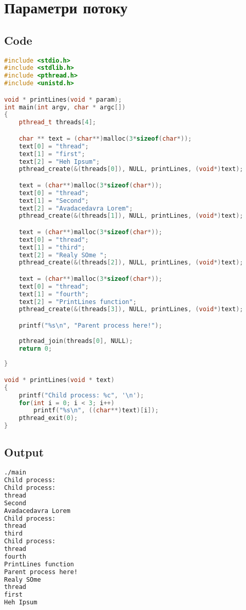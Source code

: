 \documentclass{article}
\begin{document}
\newpage
\section{Параметри потоку}
\subsection{Code}\vspace{-3mm}
\begin{lstlisting}[language=C++]
#include <stdio.h>
#include <stdlib.h>
#include <pthread.h>
#include <unistd.h>

void * printLines(void * param);
int main(int argv, char * argc[])
{
    pthread_t threads[4];

    char ** text = (char**)malloc(3*sizeof(char*));
    text[0] = "thread"; 
    text[1] = "first"; 
    text[2] = "Heh Ipsum";
    pthread_create(&(threads[0]), NULL, printLines, (void*)text);

    text = (char**)malloc(3*sizeof(char*));
    text[0] = "thread"; 
    text[1] = "Second"; 
    text[2] = "Avadacedavra Lorem";
    pthread_create(&(threads[1]), NULL, printLines, (void*)text);

    text = (char**)malloc(3*sizeof(char*));
    text[0] = "thread"; 
    text[1] = "third"; 
    text[2] = "Realy SOme ";
    pthread_create(&(threads[2]), NULL, printLines, (void*)text);

    text = (char**)malloc(3*sizeof(char*));
    text[0] = "thread"; 
    text[1] = "fourth"; 
    text[2] = "PrintLines function";
    pthread_create(&(threads[3]), NULL, printLines, (void*)text);

    printf("%s\n", "Parent process here!");
    
    pthread_join(threads[0], NULL);
    return 0;
    
}

void * printLines(void * text)
{
    printf("Child process: %c", '\n');
    for(int i = 0; i < 3; i++)
        printf("%s\n", ((char**)text)[i]);
    pthread_exit(0);
}
\end{lstlisting}

\subsection{Output}\vspace{-3mm}
\begin{lstlisting}[language=BASH]
./main 
Child process: 
Child process: 
thread
Second
Avadacedavra Lorem
Child process: 
thread
third
Child process: 
thread
fourth
PrintLines function
Parent process here!
Realy SOme 
thread
first
Heh Ipsum

\end{lstlisting}
\end{document}

